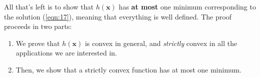 \documentclass[../../main.tex]{subfiles}
\begin{document}

All that's left is to show that $h(\bm{x})$ has \textbf{at most} one minimum corresponding to the solution (\ref{eqn:17}), meaning that everything is well defined. The proof proceeds in two parts:
\begin{enumerate}
    \item We prove that $h(\bm{x})$ is convex in general, and \textit{strictly} convex in all the applications we are interested in.  
    \item Then, we show that a strictly convex function has at most one minimum.
\end{enumerate}
 
\end{document}
